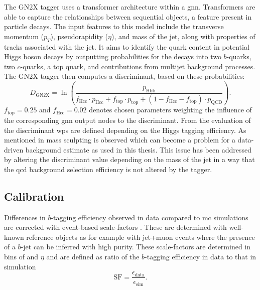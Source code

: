 The GN2X tagger uses a transformer architecture \citep{ATL-PHYS-PUB-2023-021} within a \ac{gnn}. Transformers are able to capture the relationships between sequential objects, a feature present in particle decays. The input features to this model include the transverse momentum ($p_T$), pseudorapidity ($\eta$), and mass of the jet, along with properties of tracks associated with the jet. It aims to identify the quark content in potential Higgs boson decays by outputting probabilities for the decays into two $b$-quarks, two $c$-quarks, a top quark, and contributions from multijet background processes. The GN2X tagger then computes a discriminant, based on these probabilities:
\begin{equation}
  D_{\text{GN2X}}=\ln\left({\frac{p_{\text{Hbb}}}{
  f_{\text{Hcc}}\cdot p_{\text{Hcc}}+
  f_{\text{top}}\cdot p_{\text{top}}+
  (1-f_{\text{Hcc}}-f_{\text{top}})\cdot p_{\text{QCD}}}}\right).
\end{equation}
$f_\text{top}=0.25$ and $f_\text{Hcc}=0.02$ denotes chosen parameters weighting the influence of the corresponding \ac{gnn} output nodes to the discriminant. From the evaluation of the discriminant \acp{wp} are defined depending on the Higgs tagging efficiency. As mentioned in \citep{ATL-PHYS-PUB-2023-021} mass sculpting is observed which can become a problem for a data-driven background estimate as used in this thesis. This issue has been addressed by altering the discriminant value depending on the mass of the jet in a way that the \ac{qcd} background selection efficiency is not altered by the tagger.

\subsection{Calibration}
Differences in $b$-tagging efficiency observed in data compared to \ac{mc} simulations are corrected with event-based scale-factors \citep{1512.01094,ATLAS-CONF-2012-043}. These are determined with well-known reference objects as for example with jet+muon events where the presence of a $b$-jet can be inferred with high purity. These scale-factors are determined in bins of \pt and $\eta$ and are defined as ratio of the $b$-tagging efficiency in data to that in simulation
\begin{equation}
  \text{SF} = \frac{\epsilon_\text{data}}{\epsilon_\text{sim}}.
\end{equation}

